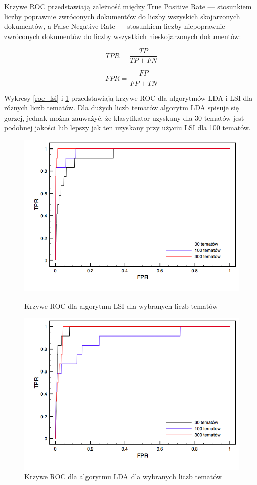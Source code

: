 \documentclass[11pt,a4paper]{article}
\begin{document}
Krzywe ROC przedstawiają zależność między True Positive Rate --- stosunkiem
liczby poprawnie zwróconych dokumentów do liczby wszyskich skojarzonych
dokumentów, a False Negative Rate --- stosunkiem liczby niepoprawnie zwróconych
dokumentów do liczby wszystkich nieskojarzonych dokumentów:

\begin{equation}
TPR = \frac{TP}{TP + FN}
\end{equation}

\begin{equation}
FPR = \frac{FP}{FP + TN}
\end{equation}

Wykresy \ref{roc_lsi} i \ref{roc_lda} przedstawiają krzywe ROC dla algorytmów
LDA i LSI dla różnych liczb tematów.  Dla dużych liczb tematów algorytm LDA
spisuje się gorzej, jednak można zauważyć, że klasyfikator uzyskany dla 30
tematów jest podobnej jakości lub lepszy jak ten uzyskany przy użyciu LSI dla
100 tematów.


\begin{figure}[h]
\includegraphics[width=\linewidth]{gfx/lsi_roc.png}
\caption{Krzywe ROC dla algorytmu LSI dla wybranych liczb tematów}
\label{roc_lsi}

\includegraphics[width=\linewidth]{gfx/lda_roc.png}
\caption{Krzywe ROC dla algorytmu LDA dla wybranych liczb tematów}
\label{roc_lda}
\end{figure}
\end{document}
